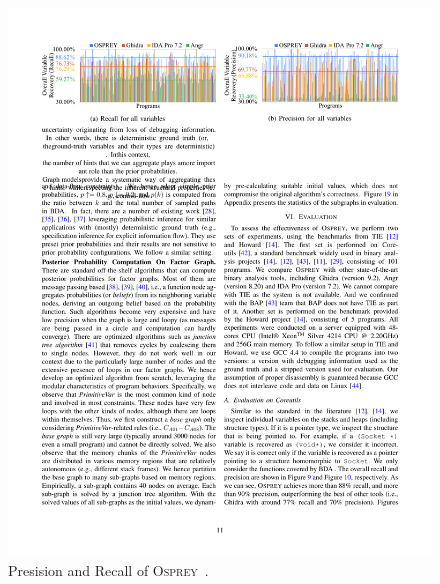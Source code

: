 \begin{figure}[tb]
  \centering
  \includegraphics[width=1.0\textwidth]{fig/OSPREY.pdf}
  \caption{Presision and Recall of \textsc{Osprey}~\cite{zhang2021osprey}.}
  \label{fig:osprey}
\end{figure}

